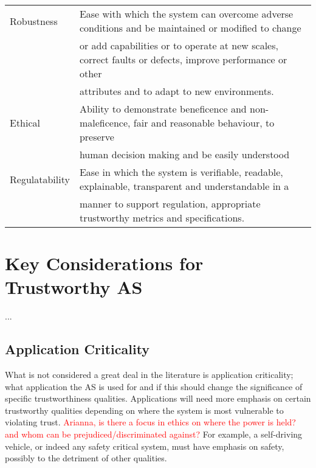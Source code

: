 \begin{table*}[t]
\begin{tabular}{ll}
Robustness & Ease with which the system can overcome adverse conditions and be maintained or modified to change\\
&or add capabilities or to operate at new scales, correct faults or defects, improve performance or other\\
&attributes and to adapt to new environments.\\

Ethical & Ability to demonstrate beneficence and non-maleficence, fair and reasonable behaviour, to preserve\\
&human decision making and be easily understood\\

Regulatability & Ease in which the system is verifiable, readable, explainable, transparent and understandable in a \\
&manner to support regulation, appropriate trustworthy metrics and specifications.\\

\bottomrule
\end{tabular}

\label{tab:ontology}
\end{table*}



\section{Key Considerations for Trustworthy AS} \label{sec:key}

...

\subsection{Application Criticality} \label{sec:appcrit}

What is not considered a great deal in the literature is application criticality; what application the AS is used for and if this should change the significance of specific trustworthiness qualities. Applications will need more emphasis on certain trustworthy qualities depending on where the system is most vulnerable to violating trust. 
%
\textcolor{red}{Arianna, is there a focus in ethics on where the power is held? and whom can be prejudiced/discriminated against?} 
%
For example, a self-driving vehicle, or indeed any safety critical system, must have emphasis on safety, possibly to the detriment of other qualities. 

